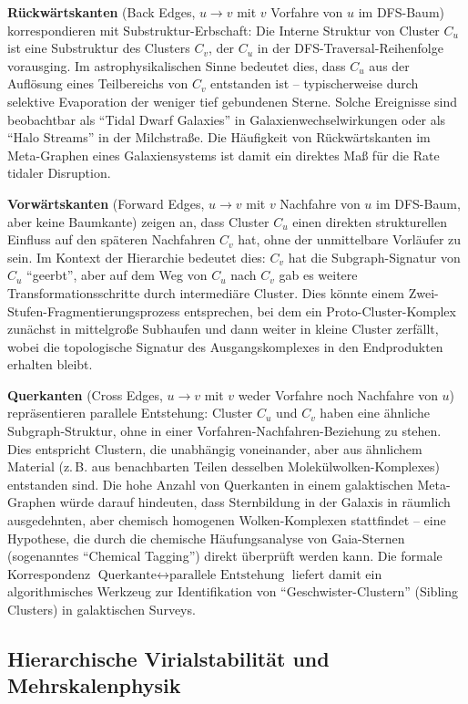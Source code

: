 ﻿\documentclass[a4paper,12pt]{report}
\theoremstyle{definition}
\begin{document}
\textbf{Rückwärtskanten} (Back Edges, $u \to v$ mit $v$ Vorfahre von $u$ im DFS-Baum) korrespondieren mit Substruktur-Erbschaft: Die Interne Struktur von Cluster $C_u$ ist eine Substruktur des Clusters $C_v$, der $C_u$ in der DFS-Traversal-Reihenfolge vorausging. Im astrophysikalischen Sinne bedeutet dies, dass $C_u$ aus der Auflösung eines Teilbereichs von $C_v$ entstanden ist -- typischerweise durch selektive Evaporation der weniger tief gebundenen Sterne. Solche Ereignisse sind beobachtbar als ``Tidal Dwarf Galaxies'' in Galaxienwechselwirkungen oder als ``Halo Streams'' in der Milchstraße. Die Häufigkeit von Rückwärtskanten im Meta-Graphen eines Galaxiensystems ist damit ein direktes Maß für die Rate tidaler Disruption.

\textbf{Vorwärtskanten} (Forward Edges, $u \to v$ mit $v$ Nachfahre von $u$ im DFS-Baum, aber keine Baumkante) zeigen an, dass Cluster $C_u$ einen direkten strukturellen Einfluss auf den späteren Nachfahren $C_v$ hat, ohne der unmittelbare Vorläufer zu sein. Im Kontext der Hierarchie bedeutet dies: $C_v$ hat die Subgraph-Signatur von $C_u$ ``geerbt'', aber auf dem Weg von $C_u$ nach $C_v$ gab es weitere Transformationsschritte durch intermediäre Cluster. Dies könnte einem Zwei-Stufen-Fragmentierungsprozess entsprechen, bei dem ein Proto-Cluster-Komplex zunächst in mittelgroße Subhaufen und dann weiter in kleine Cluster zerfällt, wobei die topologische Signatur des Ausgangskomplexes in den Endprodukten erhalten bleibt.

\textbf{Querkanten} (Cross Edges, $u \to v$ mit $v$ weder Vorfahre noch Nachfahre von $u$) repräsentieren parallele Entstehung: Cluster $C_u$ und $C_v$ haben eine ähnliche Subgraph-Struktur, ohne in einer Vorfahren-Nachfahren-Beziehung zu stehen. Dies entspricht Clustern, die unabhängig voneinander, aber aus ähnlichem Material (z.\,B. aus benachbarten Teilen desselben Molekülwolken-Komplexes) entstanden sind. Die hohe Anzahl von Querkanten in einem galaktischen Meta-Graphen würde darauf hindeuten, dass Sternbildung in der Galaxis in räumlich ausgedehnten, aber chemisch homogenen Wolken-Komplexen stattfindet -- eine Hypothese, die durch die chemische Häufungsanalyse von Gaia-Sternen (sogenanntes ``Chemical Tagging'') direkt überprüft werden kann. Die formale Korrespondenz $\text{Querkante} \leftrightarrow \text{parallele Entstehung}$ liefert damit ein algorithmisches Werkzeug zur Identifikation von ``Geschwister-Clustern'' (Sibling Clusters) in galaktischen Surveys.

\subsection{Hierarchische Virialstabilität und Mehrskalenphysik}
\end{document}
